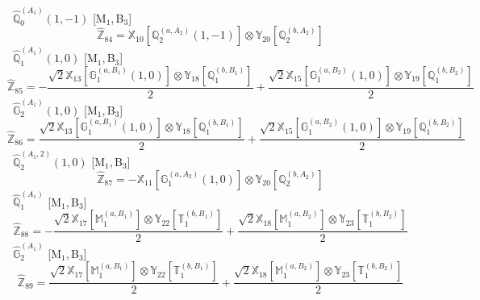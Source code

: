 \documentclass[fleqn,10pt,landscape]{article}
\begin{document}
\begin{itemize}
\begin{dmath*}
\end{dmath*}
\vspace{4mm}
\noindent {} $\,\,\,\hat{\mathbb{Q}}_{0}^{(A_{1})}(1,-1)$ [M$_{1}$,\,B$_{3}$]
\begin{dmath*}
\hat{\mathbb{Z}}_{84}=\mathbb{X}_{10}[\mathbb{Q}_{2}^{(a,A_{2})}(1,-1)] \otimes\mathbb{Y}_{20}[\mathbb{Q}_{2}^{(b,A_{2})}]
\end{dmath*}
\vspace{4mm}
\noindent {} $\,\,\,\hat{\mathbb{Q}}_{1}^{(A_{1})}(1,0)$ [M$_{1}$,\,B$_{3}$]
\begin{dmath*}
\hat{\mathbb{Z}}_{85}=- \frac{\sqrt{2} \mathbb{X}_{13}[\mathbb{G}_{1}^{(a,B_{1})}(1,0)] \otimes\mathbb{Y}_{18}[\mathbb{Q}_{1}^{(b,B_{1})}]}{2} + \frac{\sqrt{2} \mathbb{X}_{15}[\mathbb{G}_{1}^{(a,B_{2})}(1,0)] \otimes\mathbb{Y}_{19}[\mathbb{Q}_{1}^{(b,B_{2})}]}{2}
\end{dmath*}
\vspace{4mm}
\noindent {} $\,\,\,\hat{\mathbb{G}}_{2}^{(A_{1})}(1,0)$ [M$_{1}$,\,B$_{3}$]
\begin{dmath*}
\hat{\mathbb{Z}}_{86}=\frac{\sqrt{2} \mathbb{X}_{13}[\mathbb{G}_{1}^{(a,B_{1})}(1,0)] \otimes\mathbb{Y}_{18}[\mathbb{Q}_{1}^{(b,B_{1})}]}{2} + \frac{\sqrt{2} \mathbb{X}_{15}[\mathbb{G}_{1}^{(a,B_{2})}(1,0)] \otimes\mathbb{Y}_{19}[\mathbb{Q}_{1}^{(b,B_{2})}]}{2}
\end{dmath*}
\vspace{4mm}
\noindent {} $\,\,\,\hat{\mathbb{Q}}_{2}^{(A_{1},2)}(1,0)$ [M$_{1}$,\,B$_{3}$]
\begin{dmath*}
\hat{\mathbb{Z}}_{87}=- \mathbb{X}_{11}[\mathbb{G}_{1}^{(a,A_{2})}(1,0)] \otimes\mathbb{Y}_{20}[\mathbb{Q}_{2}^{(b,A_{2})}]
\end{dmath*}
\vspace{4mm}
\noindent {} $\,\,\,\hat{\mathbb{Q}}_{1}^{(A_{1})}$ [M$_{1}$,\,B$_{3}$]
\begin{dmath*}
\hat{\mathbb{Z}}_{88}=- \frac{\sqrt{2} \mathbb{X}_{17}[\mathbb{M}_{1}^{(a,B_{1})}] \otimes\mathbb{Y}_{22}[\mathbb{T}_{1}^{(b,B_{1})}]}{2} + \frac{\sqrt{2} \mathbb{X}_{18}[\mathbb{M}_{1}^{(a,B_{2})}] \otimes\mathbb{Y}_{23}[\mathbb{T}_{1}^{(b,B_{2})}]}{2}
\end{dmath*}
\vspace{4mm}
\noindent {} $\,\,\,\hat{\mathbb{G}}_{2}^{(A_{1})}$ [M$_{1}$,\,B$_{3}$]
\begin{dmath*}
\hat{\mathbb{Z}}_{89}=\frac{\sqrt{2} \mathbb{X}_{17}[\mathbb{M}_{1}^{(a,B_{1})}] \otimes\mathbb{Y}_{22}[\mathbb{T}_{1}^{(b,B_{1})}]}{2} + \frac{\sqrt{2} \mathbb{X}_{18}[\mathbb{M}_{1}^{(a,B_{2})}] \otimes\mathbb{Y}_{23}[\mathbb{T}_{1}^{(b,B_{2})}]}{2}

\end{dmath*}
\end{itemize}
\end{document}

